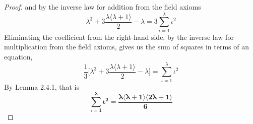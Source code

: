 \documentclass[a4paper, 12pt]{article}
\theoremstyle{plain}
\begin{document}
\begin{proof}
    and by the inverse law for addition from the field axioms
    \begin{equation*}
        \lambda ^3 
            + 
        3 \frac{ \lambda \big \langle \lambda + 1 \big \rangle }
        {2} 
            - 
        \lambda 
            = 
        3 \sum_{\iota=1}^\lambda \iota ^2
    \end{equation*}
    Eliminating the coefficient  from the right-hand side, 
    by the inverse law for multiplication from the field axioms, 
    gives us the sum of squares in terms of an equation, 
    \begin{equation*}
        \frac{1}{3}
        \bigg[
            \lambda ^3 
                + 
            3 \frac{ \lambda \big \langle \lambda + 1 \big \rangle }
            {2} 
                - 
            \lambda
        \bigg]
            = 
        \sum_{\iota=1}^\lambda \iota ^2
    \end{equation*}
    By Lemma 2.4.1, that is
    \begin{equation*}
        \bm{
            \sum_{\iota=1}^\lambda \iota ^2 
                = 
            \frac{ 
                \lambda \big \langle \lambda + 1 \big \rangle
                \big \langle 2 \lambda + 1 \big \rangle 
            }
            {6}
        }
    \end{equation*}
\color{lightgray} \end{proof}
\pagebreak
\end{document}
